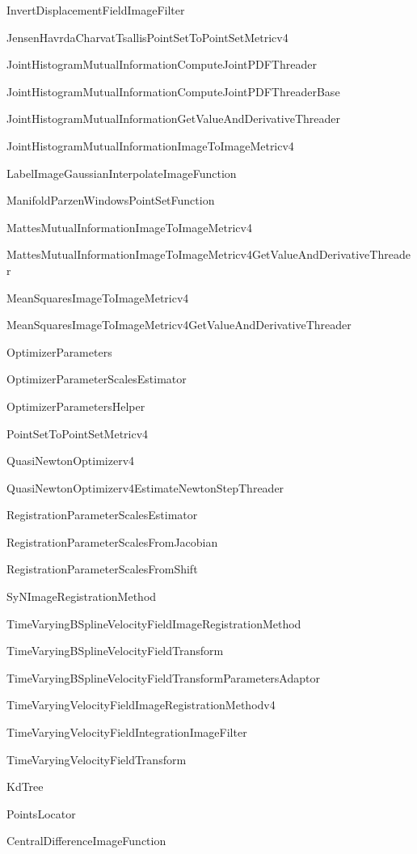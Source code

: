 \documentclass{frontiersSCNS}
\begin{document}
InvertDisplacementFieldImageFilter

JensenHavrdaCharvatTsallisPointSetToPointSetMetricv4 

JointHistogramMutualInformationComputeJointPDFThreader

JointHistogramMutualInformationComputeJointPDFThreaderBase

JointHistogramMutualInformationGetValueAndDerivativeThreader

JointHistogramMutualInformationImageToImageMetricv4 

LabelImageGaussianInterpolateImageFunction

ManifoldParzenWindowsPointSetFunction

MattesMutualInformationImageToImageMetricv4

MattesMutualInformationImageToImageMetricv4GetValueAndDerivativeThreader

MeanSquaresImageToImageMetricv4

MeanSquaresImageToImageMetricv4GetValueAndDerivativeThreader

OptimizerParameters

OptimizerParameterScalesEstimator

OptimizerParametersHelper

PointSetToPointSetMetricv4

QuasiNewtonOptimizerv4 

QuasiNewtonOptimizerv4EstimateNewtonStepThreader

RegistrationParameterScalesEstimator

RegistrationParameterScalesFromJacobian

RegistrationParameterScalesFromShift

SyNImageRegistrationMethod 

TimeVaryingBSplineVelocityFieldImageRegistrationMethod

TimeVaryingBSplineVelocityFieldTransform

TimeVaryingBSplineVelocityFieldTransformParametersAdaptor

TimeVaryingVelocityFieldImageRegistrationMethodv4

TimeVaryingVelocityFieldIntegrationImageFilter

TimeVaryingVelocityFieldTransform


KdTree

PointsLocator 

CentralDifferenceImageFunction



\end{document}
